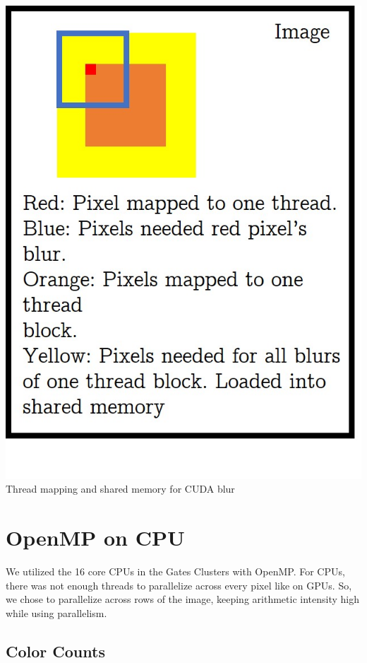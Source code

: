 \documentclass[12pt]{article}
\begin{document}
\begin{center}
\includegraphics[scale=0.3]{mapping.jpg} \\
Thread mapping and shared memory for CUDA blur
\end{center}

\section{OpenMP on CPU}

We utilized the 16 core CPUs in the Gates Clusters with OpenMP. For CPUs, there
was not enough threads to parallelize across every pixel like on GPUs. So, we
chose to parallelize across rows of the image, keeping arithmetic intensity
high while using parallelism.

\subsection{Color Counts}
\end{document}
